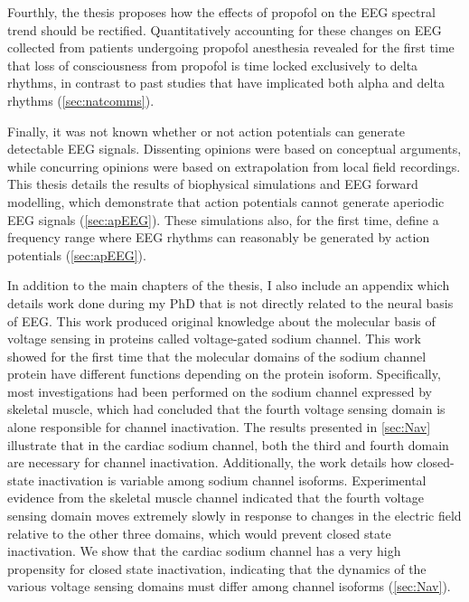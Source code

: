 Fourthly, the thesis proposes how the effects of propofol on the EEG spectral trend should be rectified. Quantitatively accounting for these changes on EEG collected from patients undergoing propofol anesthesia revealed for the first time that loss of consciousness from propofol is time locked exclusively to delta rhythms, in contrast to past studies that have implicated both alpha and delta rhythms  (\autoref{sec:natcomms}).

Finally, it was not known whether or not action potentials can generate detectable EEG signals. Dissenting opinions were based on conceptual arguments, while concurring opinions were based on extrapolation from local field recordings. This thesis details the results of biophysical simulations and EEG forward modelling, which demonstrate that action potentials cannot generate aperiodic EEG signals (\autoref{sec:apEEG}). These simulations also, for the first time, define a frequency range where EEG rhythms can reasonably be generated by action potentials (\autoref{sec:apEEG}).

In addition to the main chapters of the thesis, I also include an appendix which details work done during my PhD that is not directly related to the neural basis of EEG. This work produced original knowledge about the molecular basis of voltage sensing in proteins called voltage-gated sodium channel. This work showed for the first time that the molecular domains of the sodium channel protein have different functions depending on the protein isoform. Specifically, most investigations had been performed on the sodium channel expressed by skeletal muscle, which had concluded that the fourth voltage sensing domain is alone responsible for channel inactivation. The results presented in \autoref{sec:Nav} illustrate that in the cardiac sodium channel, both the third and fourth domain are necessary for channel inactivation. Additionally, the work details how closed-state inactivation is variable among sodium channel isoforms. Experimental evidence from the skeletal muscle channel indicated that the fourth voltage sensing domain moves extremely slowly in response to changes in the electric field relative to the other three domains, which would prevent closed state inactivation. We show that the cardiac sodium channel has a very high propensity for closed state inactivation, indicating that the dynamics of the various voltage sensing domains must differ among channel isoforms (\autoref{sec:Nav}).

